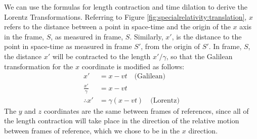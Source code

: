 We can use the formulas for length contraction and time dilation to derive the Lorentz Transformations. Referring to Figure \ref{fig:specialrelativity:translation}, $x$ refers to the distance between a point in space-time and the origin of the $x$ axis in the frame, $S$, as measured in frame, $S$. Similarly, $x'$, is the distance to the point in space-time as measured in frame $S'$, from the origin of $S'$. In frame, $S$, the distance $x'$ will be contracted to the length $x'/\gamma$, so that the Galilean transformation for the $x$ coordinate is modified as follows:
\begin{align*}
x' &= x - vt\quad\text{(Galilean)}\\
\frac{x'}{\gamma} &= x - vt\\
\therefore x'&=\gamma (x-vt)\quad\text{(Lorentz)}
\end{align*}
The $y$ and $z$ coordinates are the same between frames of references, since all of the length contraction will take place in the direction of the relative motion between frames of reference, which we chose to be in the $x$ direction.


